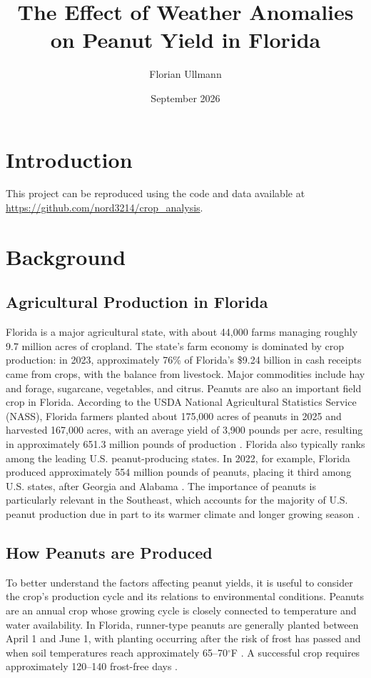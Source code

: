 \documentclass{article}
\title{The Effect of Weather Anomalies on Peanut Yield in Florida}
\author{Florian Ullmann}
\date{September 2026}
\begin{document}
\maketitle

\section{Introduction}

This project can be reproduced using the code and data available at \url{https://github.com/nord3214/crop_analysis}.

\newpage

\section{Background}

\subsection{Agricultural Production in Florida}

Florida is a major agricultural state, with about 44,000 farms managing roughly 9.7 million acres of cropland. The state's farm economy is dominated by crop production: in 2023, approximately 76\% of Florida's \$9.24 billion in cash receipts came from crops, with the balance from livestock. Major commodities include hay and forage, sugarcane, vegetables, and citrus. Peanuts are also an important field crop in Florida. According to the USDA National Agricultural Statistics Service (NASS), Florida farmers planted about 175,000 acres of peanuts in 2025 and harvested 167,000 acres, with an average yield of 3,900 pounds per acre, resulting in approximately 651.3 million pounds of production \cite{FloridaAgricultureOverview}. Florida also typically ranks among the leading U.S. peanut-producing states. In 2022, for example, Florida produced approximately 554 million pounds of peanuts, placing it third among U.S. states, after Georgia and Alabama \cite{PeanutProductionUS}. The importance of peanuts is particularly relevant in the Southeast, which accounts for the majority of U.S. peanut production due in part to its warmer climate and longer growing season \cite{PeanutProductionGuide}.

\subsection{How Peanuts are Produced}

To better understand the factors affecting peanut yields, it is useful to consider the crop's production cycle and its relations to environmental conditions. Peanuts are an annual crop whose growing cycle is closely connected to temperature and water availability. In Florida, runner-type peanuts are generally planted between April 1 and June 1, with planting occurring after the risk of frost has passed and when soil temperatures reach approximately 65--70$^\circ$F \cite{PeanutPlantingDates,FloridaPeanutsIndustry}. A successful crop requires approximately 120--140 frost-free days \cite{FloridaPeanutsIndustry}. 
\end{document}
